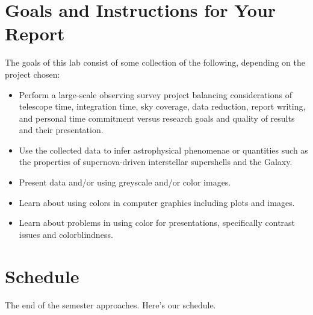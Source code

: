 \documentclass[psfig,preprint]{aastex}
\begin{document}
\section{Goals and Instructions for Your Report}

\noindent
The goals of this lab consist of some collection of the following,
depending on the project chosen:

\begin{itemize}

  \item Perform a large-scale observing survey project balancing
    considerations of telescope time, integration time, sky coverage,
    data reduction, report writing, and personal time commitment versus
    research goals and quality of results and their presentation.

\item Use the collected data to infer astrophysical phenomenae or
  quantities such as the properties of supernova-driven interstellar
  supershells and the Galaxy.

\item Present data and/or using greyscale and/or color images.

\item Learn about using colors in computer graphics including plots and
  images. 

\item Learn about problems in using color for presentations,
  specifically contrast issues and colorblindness.

\end{itemize}


\section{Schedule}

\noindent
The end of the semester approaches. Here's our
schedule.
\end{document}
